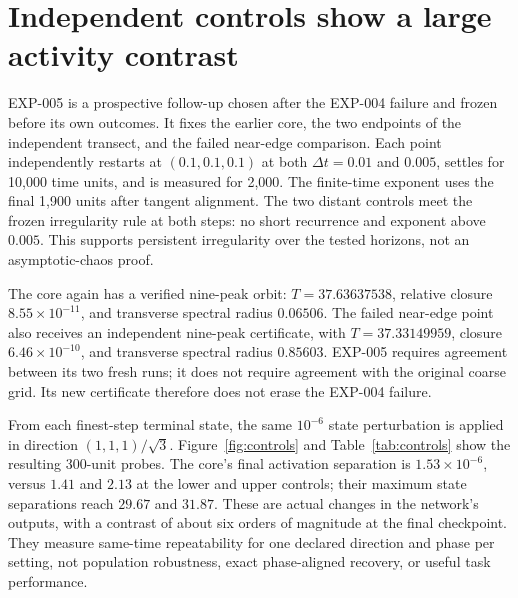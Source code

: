 \documentclass[11pt,letterpaper]{article}
\begin{document}
\section{Independent controls show a large activity contrast}
EXP-005 is a prospective follow-up chosen after the EXP-004 failure and frozen before its own outcomes. It fixes the earlier core, the two endpoints of the independent transect, and the failed near-edge comparison. Each point independently restarts at $(0.1,0.1,0.1)$ at both $\Delta t=0.01$ and $0.005$, settles for 10,000 time units, and is measured for 2,000. The finite-time exponent uses the final 1,900 units after tangent alignment. The two distant controls meet the frozen irregularity rule at both steps: no short recurrence and exponent above $0.005$. This supports persistent irregularity over the tested horizons, not an asymptotic-chaos proof.

The core again has a verified nine-peak orbit: $T=37.63637538$, relative closure $8.55\times10^{-11}$, and transverse spectral radius $0.06506$. The failed near-edge point also receives an independent nine-peak certificate, with $T=37.33149959$, closure $6.46\times10^{-10}$, and transverse spectral radius $0.85603$. EXP-005 requires agreement between its two fresh runs; it does not require agreement with the original coarse grid. Its new certificate therefore does not erase the EXP-004 failure.

From each finest-step terminal state, the same $10^{-6}$ state perturbation is applied in direction $(1,1,1)/\sqrt3$. Figure~\ref{fig:controls} and Table~\ref{tab:controls} show the resulting 300-unit probes. The core's final activation separation is $1.53\times10^{-6}$, versus $1.41$ and $2.13$ at the lower and upper controls; their maximum state separations reach $29.67$ and $31.87$. These are actual changes in the network's outputs, with a contrast of about six orders of magnitude at the final checkpoint. They measure same-time repeatability for one declared direction and phase per setting, not population robustness, exact phase-aligned recovery, or useful task performance.
\end{document}
